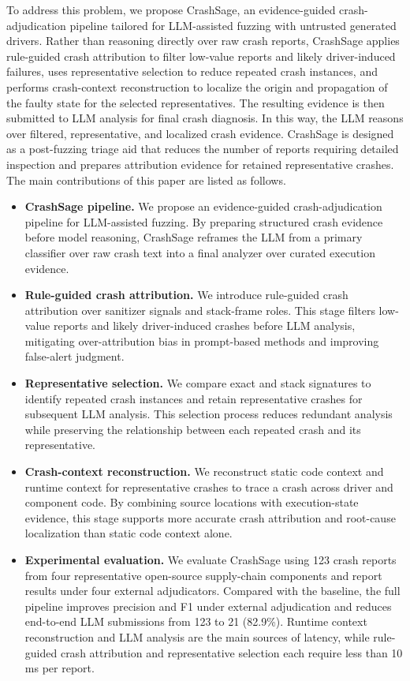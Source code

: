 \documentclass[pdflatex,sn-basic]{sn-jnl}%
\theoremstyle{thmstyleone}%
\theoremstyle{thmstyletwo}%
\theoremstyle{thmstylethree}%
\begin{document}
To address this problem, we propose CrashSage, an evidence-guided crash-adjudication pipeline tailored for LLM-assisted fuzzing with untrusted generated drivers. Rather than reasoning directly over raw crash reports, CrashSage applies rule-guided crash attribution to filter low-value reports and likely driver-induced failures, uses representative selection to reduce repeated crash instances, and performs crash-context reconstruction to localize the origin and propagation of the faulty state for the selected representatives. The resulting evidence is then submitted to LLM analysis for final crash diagnosis. In this way, the LLM reasons over filtered, representative, and localized crash evidence. CrashSage is designed as a post-fuzzing triage aid that reduces the number of reports requiring detailed inspection and prepares attribution evidence for retained representative crashes. The main contributions of this paper are listed as follows.

\begin{itemize}
    \item \textbf{CrashSage pipeline.} We propose an evidence-guided crash-adjudication pipeline for LLM-assisted fuzzing. By preparing structured crash evidence before model reasoning, CrashSage reframes the LLM from a primary classifier over raw crash text into a final analyzer over curated execution evidence.
    \item \textbf{Rule-guided crash attribution.} We introduce rule-guided crash attribution over sanitizer signals and stack-frame roles. This stage filters low-value reports and likely driver-induced crashes before LLM analysis, mitigating over-attribution bias in prompt-based methods and improving false-alert judgment.
    \item \textbf{Representative selection.} We compare exact and stack signatures to identify repeated crash instances and retain representative crashes for subsequent LLM analysis. This selection process reduces redundant analysis while preserving the relationship between each repeated crash and its representative.
    \item \textbf{Crash-context reconstruction.} We reconstruct static code context and runtime context for representative crashes to trace a crash across driver and component code. By combining source locations with execution-state evidence, this stage supports more accurate crash attribution and root-cause localization than static code context alone.
    \item \textbf{Experimental evaluation.} We evaluate CrashSage using 123 crash reports from four representative open-source supply-chain components and report results under four external adjudicators. Compared with the baseline, the full pipeline improves precision and F1 under external adjudication and reduces end-to-end LLM submissions from 123 to 21 (82.9\%). Runtime context reconstruction and LLM analysis are the main sources of latency, while rule-guided crash attribution and representative selection each require less than 10 ms per report.
\end{itemize}
\end{document}
